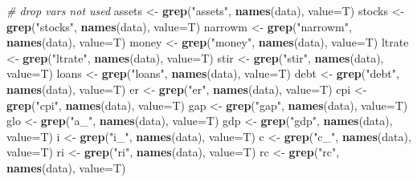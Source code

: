 \documentclass[
]{article}
\newenvironment{Shaded}{\begin{snugshade}}{\end{snugshade}}
\newcommand{\CommentTok}[1]{\textcolor[rgb]{0.56,0.35,0.01}{\textit{#1}}}
\newcommand{\DataTypeTok}[1]{\textcolor[rgb]{0.13,0.29,0.53}{#1}}
\newcommand{\KeywordTok}[1]{\textcolor[rgb]{0.13,0.29,0.53}{\textbf{#1}}}
\newcommand{\NormalTok}[1]{#1}
\newcommand{\StringTok}[1]{\textcolor[rgb]{0.31,0.60,0.02}{#1}}
\begin{document}
\begin{Shaded}
\begin{Highlighting}[]
{\CommentTok{# drop vars not used}
\NormalTok{assets <-}\StringTok{ }\KeywordTok{grep}\NormalTok{(}\StringTok{"assets"}\NormalTok{, }\KeywordTok{names}\NormalTok{(data), }\DataTypeTok{value=}\NormalTok{T)}
\NormalTok{stocks <-}\StringTok{ }\KeywordTok{grep}\NormalTok{(}\StringTok{"stocks"}\NormalTok{, }\KeywordTok{names}\NormalTok{(data), }\DataTypeTok{value=}\NormalTok{T)}
\NormalTok{narrowm <-}\StringTok{ }\KeywordTok{grep}\NormalTok{(}\StringTok{"narrowm"}\NormalTok{, }\KeywordTok{names}\NormalTok{(data), }\DataTypeTok{value=}\NormalTok{T)}
\NormalTok{money <-}\StringTok{ }\KeywordTok{grep}\NormalTok{(}\StringTok{"money"}\NormalTok{, }\KeywordTok{names}\NormalTok{(data), }\DataTypeTok{value=}\NormalTok{T)}
\NormalTok{ltrate <-}\StringTok{ }\KeywordTok{grep}\NormalTok{(}\StringTok{"ltrate"}\NormalTok{, }\KeywordTok{names}\NormalTok{(data), }\DataTypeTok{value=}\NormalTok{T)}
\NormalTok{stir <-}\StringTok{ }\KeywordTok{grep}\NormalTok{(}\StringTok{"stir"}\NormalTok{, }\KeywordTok{names}\NormalTok{(data), }\DataTypeTok{value=}\NormalTok{T)}
\NormalTok{loans <-}\StringTok{ }\KeywordTok{grep}\NormalTok{(}\StringTok{"loans"}\NormalTok{, }\KeywordTok{names}\NormalTok{(data), }\DataTypeTok{value=}\NormalTok{T)}
\NormalTok{debt <-}\StringTok{ }\KeywordTok{grep}\NormalTok{(}\StringTok{"debt"}\NormalTok{, }\KeywordTok{names}\NormalTok{(data), }\DataTypeTok{value=}\NormalTok{T)}
\NormalTok{er <-}\StringTok{ }\KeywordTok{grep}\NormalTok{(}\StringTok{"er"}\NormalTok{, }\KeywordTok{names}\NormalTok{(data), }\DataTypeTok{value=}\NormalTok{T)}
\NormalTok{cpi <-}\StringTok{ }\KeywordTok{grep}\NormalTok{(}\StringTok{"cpi"}\NormalTok{, }\KeywordTok{names}\NormalTok{(data), }\DataTypeTok{value=}\NormalTok{T)}
\NormalTok{gap <-}\StringTok{ }\KeywordTok{grep}\NormalTok{(}\StringTok{"gap"}\NormalTok{, }\KeywordTok{names}\NormalTok{(data), }\DataTypeTok{value=}\NormalTok{T)}
\NormalTok{glo <-}\StringTok{ }\KeywordTok{grep}\NormalTok{(}\StringTok{"a_"}\NormalTok{, }\KeywordTok{names}\NormalTok{(data), }\DataTypeTok{value=}\NormalTok{T)}
\NormalTok{gdp <-}\StringTok{ }\KeywordTok{grep}\NormalTok{(}\StringTok{"gdp"}\NormalTok{, }\KeywordTok{names}\NormalTok{(data), }\DataTypeTok{value=}\NormalTok{T)}
\NormalTok{i <-}\StringTok{ }\KeywordTok{grep}\NormalTok{(}\StringTok{"i_"}\NormalTok{, }\KeywordTok{names}\NormalTok{(data), }\DataTypeTok{value=}\NormalTok{T)}
\NormalTok{c <-}\StringTok{ }\KeywordTok{grep}\NormalTok{(}\StringTok{"c_"}\NormalTok{, }\KeywordTok{names}\NormalTok{(data), }\DataTypeTok{value=}\NormalTok{T)}
\NormalTok{ri <-}\StringTok{ }\KeywordTok{grep}\NormalTok{(}\StringTok{"ri"}\NormalTok{, }\KeywordTok{names}\NormalTok{(data), }\DataTypeTok{value=}\NormalTok{T)}
\NormalTok{rc <-}\StringTok{ }\KeywordTok{grep}\NormalTok{(}\StringTok{"rc"}\NormalTok{, }\KeywordTok{names}\NormalTok{(data), }\DataTypeTok{value=}\NormalTok{T)}

}
\end{Highlighting}
\end{Shaded}
\end{document}

